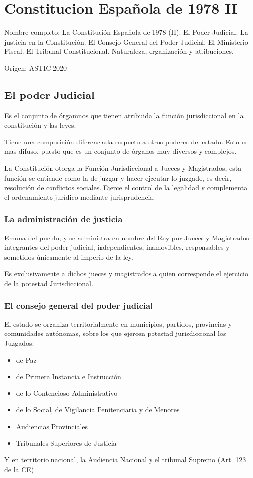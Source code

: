 \setcounter{section}{1}
\section{Constitucion Española de 1978 II}

Nombre completo:  La Constitución Española de 1978 (II). El Poder Judicial. La
justicia en la Constitución. El Consejo General del Poder Judicial.
El Ministerio Fiscal. El Tribunal Constitucional. Naturaleza,
organización y atribuciones.

Origen: ASTIC 2020

\localtableofcontents

\subsection{El poder Judicial} %
    Es el conjunto de órgamnos que tienen atribuida la función jurisdiccional en la constitución y las leyes.

    Tiene una composición diferenciada respecto a otros poderes del estado. Esto es mas difuso, puesto que es un conjunto de órganos muy diversos y complejos.

    La Constitución otorga la Función Jurisdiccional a Jueces y Magistrados, esta función se entiende como la de juzgar y hacer ejecutar lo juzgado, es decir, resolución de conflictos sociales. Ejerce el control de la legalidad y complementa el ordenamiento jurídico mediante jurisprudencia.

    \subsubsection{La administración de justicia} %
        Emana del pueblo, y se administra en nombre del Rey por Jueces y Magistrados integrantes del poder judicial, independientes, inamovibles, responsables y sometidos únicamente al imperio de la ley.

        Es exclusivamente a dichos jueces y magistrados a quien corresponde el ejercicio de la potestad Jurisdiccional.

    \subsubsection{El consejo general del poder judicial} %
        El estado se organiza territorialmente en municipios, partidos, provincias y comunidades autónomas, sobre los que ejercen potestad jurisdiccional los Juzgados:
        \begin{itemize}
            \item de Paz
            \item de Primera Instancia e Instrucción
            \item de lo Contencioso Administrativo
            \item de lo Social, de Vigilancia Penitenciaria y de Menores
            \item Audiencias Provinciales
            \item Tribunales Superiores de Justicia
        \end{itemize}
        Y en territorio nacional, la Audiencia Nacional y el tribunal Supremo (Art. 123 de la CE)

